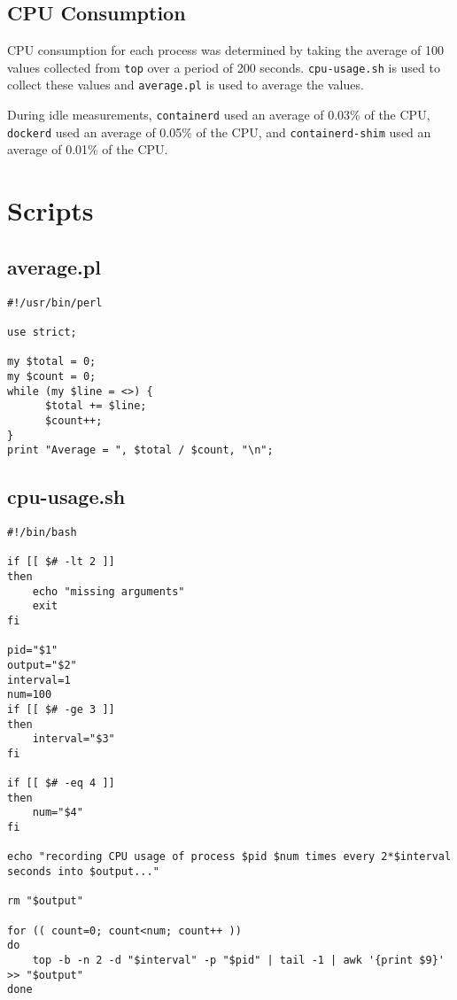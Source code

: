 \documentclass{article}
\begin{document}
\subsection{CPU Consumption}
CPU consumption for each process was determined by taking the average of 100 values collected from \texttt{top} over a period of 200 seconds. \texttt{cpu-usage.sh} is used to collect these values and \texttt{average.pl} is used to average the values.

During idle measurements, \texttt{containerd} used an average of 0.03\% of the CPU, \texttt{dockerd} used an average of 0.05\% of the CPU, and \texttt{containerd-shim} used an average of 0.01\% of the CPU.


\section{Scripts}
\subsection{average.pl}
\begin{verbatim}
#!/usr/bin/perl

use strict;

my $total = 0;
my $count = 0;
while (my $line = <>) {
      $total += $line;
      $count++;
}
print "Average = ", $total / $count, "\n";
\end{verbatim}

\subsection{cpu-usage.sh}
\begin{verbatim}
#!/bin/bash

if [[ $# -lt 2 ]]
then
    echo "missing arguments"
    exit
fi

pid="$1"
output="$2"
interval=1
num=100
if [[ $# -ge 3 ]]
then
    interval="$3"
fi

if [[ $# -eq 4 ]]
then
    num="$4"
fi

echo "recording CPU usage of process $pid $num times every 2*$interval seconds into $output..."

rm "$output"

for (( count=0; count<num; count++ ))
do
    top -b -n 2 -d "$interval" -p "$pid" | tail -1 | awk '{print $9}' >> "$output"
done
\end{verbatim}
\end{document}

